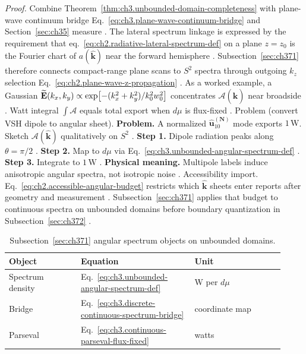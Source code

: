 \noindent\textit{Proof.}
Combine Theorem~\ref{thm:ch3.unbounded-domain-completeness} with plane-wave continuum bridge
Eq.~\eqref{eq:ch3.plane-wave-continuum-bridge} and Section~\ref{sec:ch35} measure \cite{hansen1988}.
The lateral spectrum linkage is expressed by the requirement that eq.~\eqref{eq:ch2.radiative-lateral-spectrum-def} on a plane \(z=z_{0}\) is the Fourier chart of
\(a(\widehat{\mathbf{k}})\) near the forward hemisphere \cite{stratton1941}. Subsection~\ref{sec:ch371}
therefore connects compact-range plane scans to \(S^{2}\) spectra through outgoing \(k_{z}\) selection
Eq.~\eqref{eq:ch2.plane-wave-z-propagation} \cite{harrington2001}.
As a worked example, a Gaussian \(\widetilde{\mathbf{E}}(k_{x},k_{y})\propto\exp[-(k_{x}^{2}+k_{y}^{2})/k_{0}^{2}w_{0}^{2}]\) concentrates
\(\mathcal{A}(\widehat{\mathbf{k}})\) near broadside \cite{jackson1999}. Watt integral
\(\int\mathcal{A}\) equals total export when \(d\mu\) is flux-fixed \cite{poynting1884}.
Problem (convert VSH dipole to angular sheet). \textbf{Problem.} A normalized \(\widehat{\mathbf{u}}_{10}^{(\mathbf{N})}\) mode exports \(1\,\mathrm{W}\). Sketch
\(\mathcal{A}(\widehat{\mathbf{k}})\) qualitatively on \(S^{2}\) \cite{hansen1988}.
\textbf{Step 1.} Dipole radiation peaks along \(\theta=\pi/2\) \cite{jackson1999}.
\textbf{Step 2.} Map to \(d\mu\) via Eq.~\eqref{eq:ch3.unbounded-angular-spectrum-def} \cite{stratton1941}.
\textbf{Step 3.} Integrate to \(1\,\mathrm{W}\) \cite{poynting1884}.
\textbf{Physical meaning.} Multipole labels induce anisotropic angular spectra, not isotropic noise \cite{harrington2001}.
Accessibility import. Eq.~\eqref{eq:ch2.accessible-angular-budget} restricts which \(\widehat{\mathbf{k}}\) sheets enter reports after
geometry and measurement \cite{harrington2001}. Subsection~\ref{sec:ch371} applies that budget to
continuous spectra on unbounded domains before boundary quantization in Subsection~\ref{sec:ch372}
\cite{hansen1988}.
\begin{table}[t]
\centering
\caption{Subsection~\ref{sec:ch371} angular spectrum objects on unbounded domains.}
\label{tab:ch3.371-spectrum-objects}
\small
\begin{tabular}{@{}p{0.24\linewidth}p{0.38\linewidth}p{0.30\linewidth}@{}}
\toprule
Object & Equation & Unit \\
\midrule
Spectrum density & Eq.~\eqref{eq:ch3.unbounded-angular-spectrum-def} & W per \(d\mu\) \\
Bridge & Eq.~\eqref{eq:ch3.discrete-continuous-spectrum-bridge} & coordinate map \\
Parseval & Eq.~\eqref{eq:ch3.continuous-parseval-flux-fixed} & watts \\
\bottomrule
\end{tabular}
\end{table}
